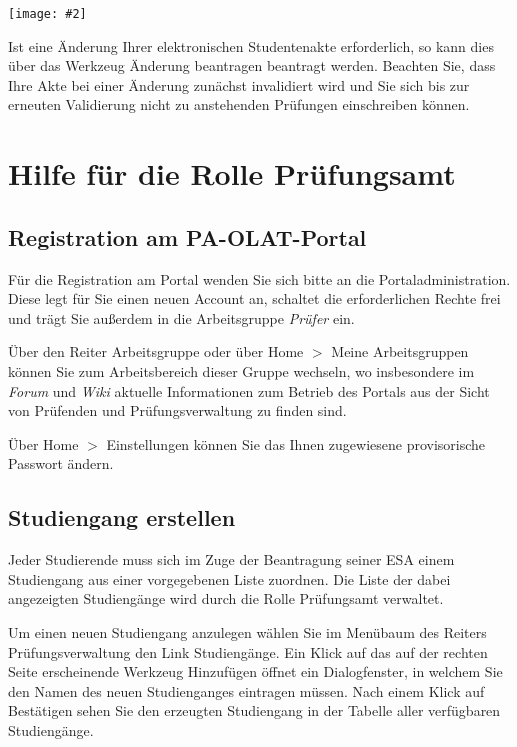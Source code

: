 \documentclass[a4paper,11pt]{article}
\newcommand{\bild}[2]{
    \begin{center}\texttt{[image: \#2]}\end{center}
}
\newcommand{\knopf}[1]{{\sc #1}}
\begin{document}
\bild{.9}{ESA-Ansicht}

Ist eine Änderung Ihrer elektronischen Studentenakte erforderlich, so kann
dies über das Werkzeug \knopf{Änderung beantragen} beantragt werden. Beachten
Sie, dass Ihre Akte bei einer Änderung zunächst invalidiert wird und Sie sich
bis zur erneuten Validierung nicht zu anstehenden Prüfungen einschreiben
können.

\clearpage
\section{Hilfe für die Rolle Prüfungsamt}

\subsection{Registration am PA-OLAT-Portal}

Für die Registration am Portal wenden Sie sich bitte an die
Portaladministration.  Diese legt für Sie einen neuen Account an, schaltet die
erforderlichen Rechte frei und trägt Sie außerdem in die Arbeitsgruppe {\em
  Prüfer} ein.

Über den Reiter \knopf{Arbeitsgruppe} oder über \knopf{Home $>$ Meine
  Arbeitsgruppen} können Sie zum Arbeitsbereich dieser Gruppe wechseln, wo
insbesondere im {\em Forum} und {\em Wiki} aktuelle Informationen zum Betrieb
des Portals aus der Sicht von Prüfenden und Prüfungsverwaltung zu finden sind.

Über \knopf{Home $>$ Einstellungen} können Sie das Ihnen zugewiesene
provisorische Passwort ändern.

\subsection{Studiengang erstellen}

Jeder Studierende muss sich im Zuge der Beantragung seiner ESA einem Studiengang
aus einer vorgegebenen Liste zuordnen.  Die Liste der dabei angezeigten
Studiengänge wird durch die Rolle Prüfungsamt verwaltet. 

Um einen neuen Studiengang anzulegen wählen Sie im Menübaum des Reiters
\knopf{Prüfungsverwaltung} den Link \knopf{Studiengänge}. Ein Klick auf das
auf der rechten Seite erscheinende Werkzeug \knopf{Hinzufügen} öffnet ein
Dialogfenster, in welchem Sie den Namen des neuen Studienganges eintragen
müssen.  Nach einem Klick auf \knopf{Bestätigen} sehen Sie den erzeugten
Studiengang in der Tabelle aller verfügbaren Studiengänge.
\end{document}
